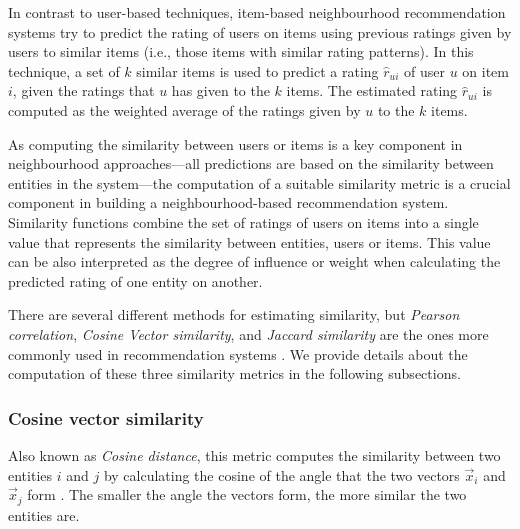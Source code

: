 

In contrast to user-based techniques, item-based neighbourhood recommendation systems try to predict the rating of users on items using previous ratings given by users to similar items (i.e., those items with similar rating patterns).
In this technique, a set of $k$ similar items is used to predict a rating ${\hat{r}}_{ui}$ of user $u$ on item $i$, given the ratings that $u$ has given to the $k$ items.
The estimated rating ${\hat{r}}_{ui}$ is computed as the weighted average of the ratings given by $u$ to the $k$ items. %

As computing the similarity between users or items is a key component in neighbourhood approaches---all predictions are based on the similarity between entities in the system---the computation of a suitable similarity metric is a crucial component in building a neighbourhood-based recommendation system.
Similarity functions combine the set of ratings of users on items into a single value that represents the similarity between entities, users or items. 
This value can be also interpreted as the degree of influence or weight when calculating the predicted rating of one entity on another.

There are several different methods for estimating similarity, but  \textit{Pearson correlation}, \emph{Cosine Vector similarity}, and \emph{Jaccard similarity} are the ones more commonly used in recommendation systems \autocite{leskovec14mining, ricci15recommender}. We provide details about the computation of these three similarity metrics in the following subsections.


\subsubsection*{Cosine vector similarity}\label{subsubsection:cosine_vector}
Also known as \emph{Cosine distance}, this metric computes the similarity between two entities $i$ and $j$ by calculating the cosine of the angle that the two vectors $\vec{x}_i$ and $\vec{x}_j$ form \autocite{salton83introduction}. The smaller the angle the vectors form, the more similar the two entities are.   

